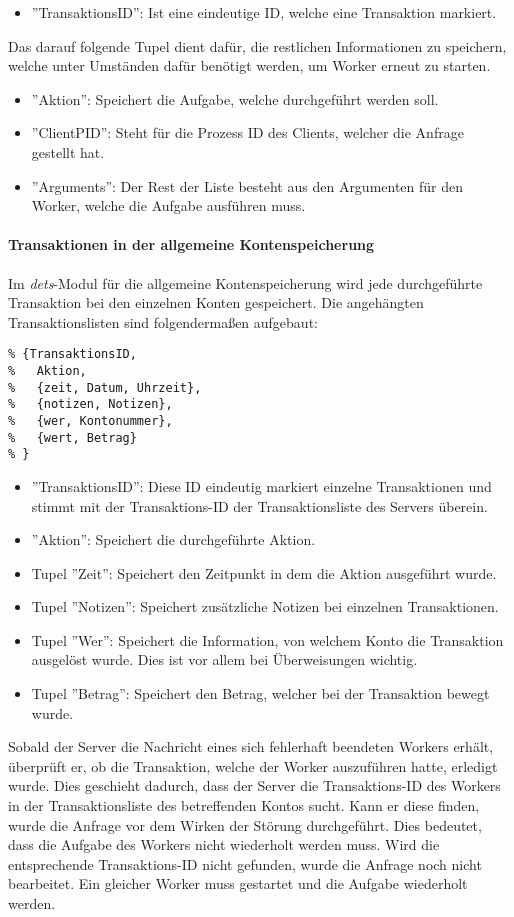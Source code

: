 \begin{itemize}
	\item ''TransaktionsID'': Ist eine eindeutige ID, welche eine Transaktion markiert.
\end{itemize}
Das darauf folgende Tupel dient dafür, die restlichen Informationen zu speichern, welche unter Umständen dafür benötigt werden, um Worker erneut zu starten.
\begin{itemize}
	\item ''Aktion'': Speichert die Aufgabe, welche durchgeführt werden soll.
	\item ''ClientPID'': Steht für die Prozess ID des Clients, welcher die Anfrage gestellt hat.
	\item ''Arguments'': Der Rest der Liste besteht aus den Argumenten für den Worker, welche die Aufgabe ausführen muss.
\end{itemize}

\paragraph{Transaktionen in der allgemeine Kontenspeicherung}

Im \textit{dets}-Modul für die allgemeine Kontenspeicherung wird jede durchgeführte Transaktion bei den einzelnen Konten gespeichert. Die angehängten Transaktionslisten sind folgendermaßen aufgebaut:

\begin{lstlisting}
% {TransaktionsID,
%	Aktion,
%	{zeit, Datum, Uhrzeit},
%	{notizen, Notizen},
%	{wer, Kontonummer},
%	{wert, Betrag}
% }  
\end{lstlisting}

\begin{itemize}
	\item ''TransaktionsID'': Diese ID eindeutig markiert einzelne Transaktionen und stimmt mit der Transaktions-ID der Transaktionsliste des Servers überein.
	\item ''Aktion'': Speichert die durchgeführte Aktion.
	\item Tupel ''Zeit'': Speichert den Zeitpunkt in dem die Aktion ausgeführt wurde.
	\item Tupel ''Notizen'': Speichert zusätzliche Notizen bei einzelnen Transaktionen.
	\item Tupel ''Wer'': Speichert die Information, von welchem Konto die Transaktion ausgelöst wurde. Dies ist vor allem bei Überweisungen wichtig.
	\item Tupel ''Betrag'': Speichert den Betrag, welcher bei der Transaktion bewegt wurde.
\end{itemize}
Sobald der Server die Nachricht eines sich fehlerhaft beendeten Workers erhält, überprüft er, ob die Transaktion, welche der Worker auszuführen hatte, erledigt wurde. Dies geschieht dadurch, dass der Server die Transaktions-ID des Workers in der Transaktionsliste des betreffenden Kontos sucht. Kann er diese finden, wurde die Anfrage vor dem Wirken der Störung durchgeführt. Dies bedeutet, dass die Aufgabe des Workers nicht wiederholt werden muss. Wird die entsprechende Transaktions-ID nicht gefunden, wurde die Anfrage noch nicht bearbeitet. Ein gleicher Worker muss gestartet und die Aufgabe wiederholt werden.

%
%
%